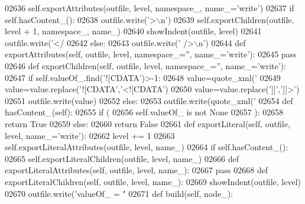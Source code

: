 \begin{DoxyCode}
{{{{{{{{{{{{{{{{{{{{{{{{{{{{{{{{{{{{{{{{{{{{{{{{{{{{{{{{{{{{{{{{{{{{{{{{{{{{{{{{{{{{{{{{{{{{{{{{{{{{{{{{{{{{{{{{{{{{{{{{{{{{{{{{{{{{{{{{{{{{{{{{{{{{{{{{{{{{{{{{{{{{{{{{{{{{{{{{{{{{{{{{{{02636         self.exportAttributes(outfile, level, namespace\_, name\_=\textcolor{stringliteral}{'write'})
02637         \textcolor{keywordflow}{if} self.hasContent_():
02638             outfile.write(\textcolor{stringliteral}{'>\(\backslash\)n'})
02639             self.exportChildren(outfile, level + 1, namespace\_, name\_)
02640             showIndent(outfile, level)
02641             outfile.write(\textcolor{stringliteral}{'</%
02642         \textcolor{keywordflow}{else}:
02643             outfile.write(\textcolor{stringliteral}{' />\(\backslash\)n'})
02644     \textcolor{keyword}{def }exportAttributes(self, outfile, level, namespace\_='', name\_='write'):
02645         \textcolor{keywordflow}{pass}
02646     \textcolor{keyword}{def }exportChildren(self, outfile, level, namespace\_='', name\_='write'):
02647         \textcolor{keywordflow}{if} self.valueOf\_.find(\textcolor{stringliteral}{'![CDATA'})>-1:
02648             value=quote_xml(\textcolor{stringliteral}{'%
02649             value=value.replace(\textcolor{stringliteral}{'![CDATA'},\textcolor{stringliteral}{'<![CDATA'})
02650             value=value.replace(\textcolor{stringliteral}{']]'},\textcolor{stringliteral}{']]>'})
02651             outfile.write(value)
02652         \textcolor{keywordflow}{else}:
02653             outfile.write(quote_xml(\textcolor{stringliteral}{'%
02654     \textcolor{keyword}{def }hasContent_(self):
02655         \textcolor{keywordflow}{if} (
02656             self.valueOf_ \textcolor{keywordflow}{is} \textcolor{keywordflow}{not} \textcolor{keywordtype}{None}
02657             ):
02658             \textcolor{keywordflow}{return} \textcolor{keyword}{True}
02659         \textcolor{keywordflow}{else}:
02660             \textcolor{keywordflow}{return} \textcolor{keyword}{False}
02661     \textcolor{keyword}{def }exportLiteral(self, outfile, level, name\_='write'):
02662         level += 1
02663         self.exportLiteralAttributes(outfile, level, name\_)
02664         \textcolor{keywordflow}{if} self.hasContent_():
02665             self.exportLiteralChildren(outfile, level, name\_)
02666     \textcolor{keyword}{def }exportLiteralAttributes(self, outfile, level, name\_):
02667         \textcolor{keywordflow}{pass}
02668     \textcolor{keyword}{def }exportLiteralChildren(self, outfile, level, name\_):
02669         showIndent(outfile, level)
02670         outfile.write(\textcolor{stringliteral}{'valueOf\_ = "%
02671     \textcolor{keyword}{def }build(self, node\_):
}}}}}}}}}}}}}}}}}}}}}}}}}}}}}}}}}}}}}}}}}}}}}}}}}}}}}}}}}}}}}}}}}}}}}}}}}}}}}}}}}}}}}}}}}}}}}}}}}}}}}}}}}}}}}}}}}}}}}}}}}}}}}}}}}}}}}}}}}}}}}}}}}}}}}}}}}}}}}}}}}}}}}}}}}}}}}}}}}}}}}}}}}}}}}}
\end{DoxyCode}
